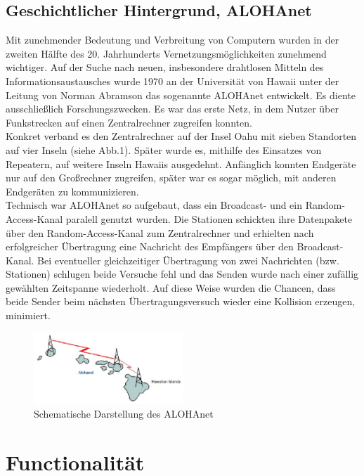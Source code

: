 \documentclass[a4paper,13pt]{scrartcl}
\begin{document}
\subsection{Geschichtlicher Hintergrund, ALOHAnet}
Mit zunehmender Bedeutung und Verbreitung von Computern wurden in der zweiten Hälfte des 20. Jahrhunderts Vernetzungsmöglichkeiten zunehmend wichtiger. Auf der Suche nach neuen, insbesondere drahtlosen Mitteln des Informationsaustausches wurde 1970 an der Universität von Hawaii unter der Leitung von Norman Abramson das sogenannte ALOHAnet entwickelt. Es diente ausschließlich Forschungszwecken. Es war das erste Netz, in dem Nutzer über Funkstrecken auf einen Zentralrechner zugreifen konnten.\\
Konkret verband es den Zentralrechner auf der Insel Oahu mit sieben Standorten auf vier Inseln (siehe Abb.1). Später wurde es, mithilfe des Einsatzes von Repeatern, auf weitere Inseln Hawaiis ausgedehnt. Anfänglich konnten Endgeräte nur auf den Großrechner zugreifen, später war es sogar möglich, mit anderen Endgeräten zu kommunizieren.\\
Technisch war ALOHAnet so aufgebaut, dass ein Broadcast- und ein Random-Access-Kanal paralell genutzt wurden. Die Stationen schickten ihre Datenpakete über den Random-Access-Kanal zum Zentralrechner und erhielten nach erfolgreicher Übertragung eine Nachricht des Empfängers über den Broadcast-Kanal. Bei eventueller gleichzeitiger Übertragung von zwei Nachrichten (bzw. Stationen) schlugen beide Versuche fehl und das Senden wurde nach einer zufällig gewählten Zeitspanne wiederholt. Auf diese Weise wurden die Chancen, dass beide Sender beim nächsten Übertragungsversuch wieder eine Kollision erzeugen, minimiert.

\begin{figure}[ht]
		\centering
	\includegraphics[width=0.5\textwidth]{alohanet.eps}
		\caption{Schematische Darstellung des ALOHAnet}
		\label{fig1}
\end{figure}

\section{Functionalität}
\end{document}
